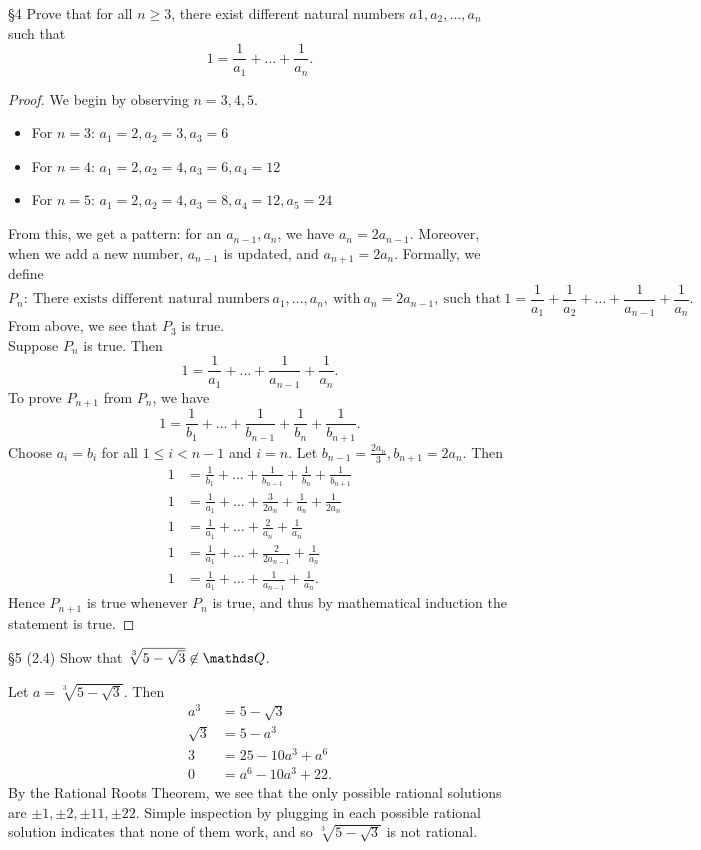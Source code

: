 \documentclass{homework}
\begin{document}
\begin{problem}{\S 4}
  Prove that for all $n\ge 3$, there exist different natural numbers $a1,a_2,\ldots, a_n$ such that
  \[
    1 = \frac{1}{a_1} + \ldots + \frac{1}{a_n}
  .\] 
\end{problem}
\begin{proof}[Proof]
  We begin by observing $n=3,4,5$.
   \begin{itemize}
    \item For $n=3$:  $ a_1=2,a_2=3,a_3=6$
    \item For $n=4$:  $ a_1=2,a_2=4,a_3=6,a_4=12$
    \item For $n=5$:  $ a_1=2,a_2=4,a_3=8,a_4=12,a_5=24$
  \end{itemize}
  From this, we get a pattern: for an $a_{n-1},a_n$, we have  $a_n = 2a_{n-1}$. Moreover, when we
  add a new number,  $a_{n-1}$ is updated, and $a_{n+1}=2a_n$. Formally, we define  \[
    P_n: ~\text{There exists different natural numbers}~a_1,\ldots, a_n,
    ~\text{with}~a_n=2a_{n-1},~\text{such that}~
    1=\frac{1}{a_1}+\frac{1}{a_2}+\ldots+\frac{1}{a_{n-1}}+\frac{1}{a_n}
  .\] 
  From above, we see that $P_3$ is true.\\
  Suppose $P_n$ is true. Then  \[
    1 = \frac{1}{a_1}  +\ldots+\frac{1}{a_{n-1}}+\frac{1}{a_n}
  .\] To prove $P_{n+1}$ from  $P_n$, we have  \[
  1 = \frac{1}{b_1} + \ldots+\frac{1}{b_{n-1}} + \frac{1}{b_n} + \frac{1}{b_{n+1}}
.\] Choose $a_i=b_i$ for all  $1\le i < n-1$ and $i=n$. Let  $b_{n-1}=\frac{2a_n}{3},
  b_{n+1}=2a_n$. Then
  \begin{align*}
    1 &= \frac{1}{b_1}+\ldots+\frac{1}{b_{n-1}}+\frac{1}{b_n}+\frac{1}{b_{n+1}} \\
    1 &= \frac{1}{a_1}+\ldots+\frac{3}{2a_n}+\frac{1}{a_n}+\frac{1}{2a_n} \\
    1 &= \frac{1}{a_1}+\ldots+\frac{2}{a_n}+\frac{1}{a_n} \\
    1 &= \frac{1}{a_1}+\ldots+\frac{2}{2a_{n-1}}+\frac{1}{a_n} \\
    1 &= \frac{1}{a_1}+\ldots+\frac{1}{a_{n-1}}+\frac{1}{a_n}
  .\end{align*}
  Hence $P_{n+1}$ is true whenever  $P_n$ is true, and thus by mathematical induction the statement
  is true.
\end{proof}

\begin{problem}{\S 5}
  (2.4) Show that $\sqrt[3]{5-\sqrt{3} } \not\in \Q$.
\end{problem}
\begin{solution}
  Let $a=\sqrt[3]{5-\sqrt{3} }$. Then
  \begin{align*}
    a^3&= 5-\sqrt{3}  \\
    \sqrt{3} &= 5-a^3 \\
    3 &= 25-10a^3+a^{6} \\
    0 &= a^{6}-10a^3+22
  .\end{align*}
  By the Rational Roots Theorem, we see that the only possible rational solutions are $\pm 1,\pm
  2,\pm 11,\pm 22$. Simple inspection by plugging in each possible rational solution indicates that
  none of them work, and so $\sqrt[3]{5-\sqrt{3} }$ is not rational.
\end{solution}
\end{document}

